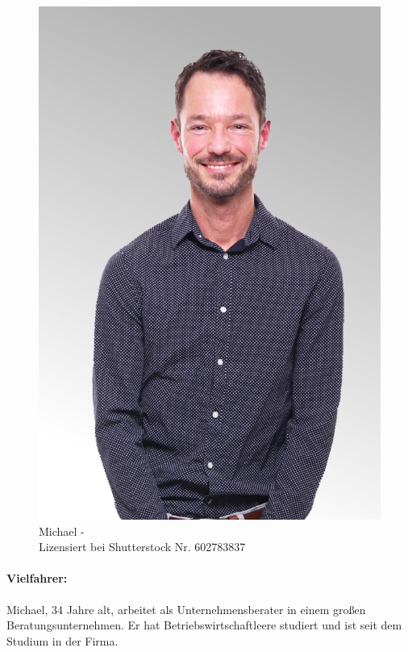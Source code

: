 \begin{figure}
    \vspace{-\intextsep}
    \centering
    \includegraphics[width=\textwidth]{contents/06_model_evaluation/01_integration/res/persona_picture_michael.png}
    \caption{Michael -\\Lizensiert bei Shutterstock Nr. 602783837}
\end{figure}

\paragraph{Vielfahrer:} Michael, 34 Jahre alt, arbeitet als Unternehmensberater in einem großen Beratungsunternehmen. Er hat Betriebswirtschaftleere studiert und ist seit dem Studium in der Firma.

